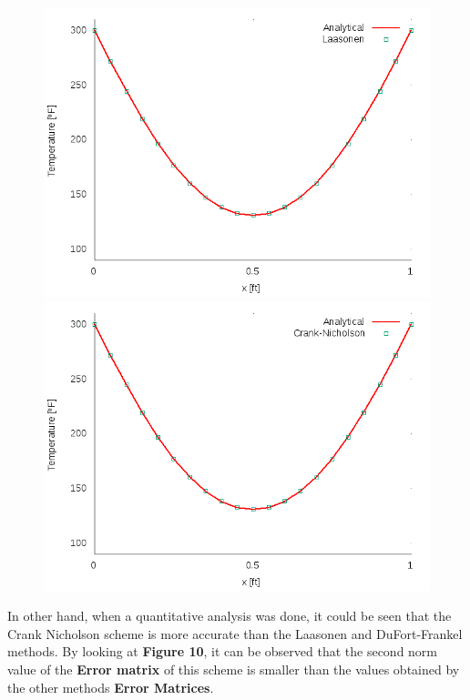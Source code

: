 \documentclass[12pt]{article}
\begin{document}
\begin{figure}[!htb]
\centering
\begin{minipage}{.5\textwidth}
  \centering
  \includegraphics[width=.8\linewidth]{Laasonent_0_4dt_0_010.png}
\end{minipage}%
\begin{minipage}{.5\textwidth}
  \centering
  \includegraphics[width=.8\linewidth]{Crank-Nicholsont_0_4.png}
\end{minipage}
\end{figure}

\par In other hand, when a quantitative analysis was done, it could be seen that the Crank Nicholson scheme is more accurate than the Laasonen and DuFort-Frankel methods. By looking at \textbf{Figure 10}, it can be observed that the second norm value of the \textbf{Error matrix} of this scheme is smaller than the values obtained by the other methods \textbf{Error Matrices}.
\end{document}
